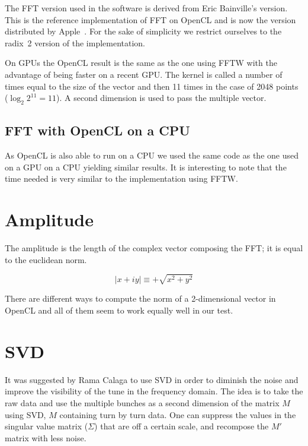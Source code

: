 The \gls{FFT} version used in the software is derived from Eric Bainville's version. This is the reference implementation of \gls{FFT} on \gls{OpenCL} and is now the version distributed by Apple~\cite{bainville11}. For the sake of simplicity we restrict ourselves to the radix~2 version of the implementation.

On \glspl{GPU} the \gls{OpenCL} result is the same as the one using \gls{FFTW} with the advantage of being faster on a recent \gls{GPU}. The kernel is called a number of times equal to the size of the vector and then 11 times in the case of 2048 points ($\log_{2}{2^{11}} = 11$). A second dimension is used to pass the multiple vector.

\subsection{FFT with OpenCL on a CPU}

As \gls{OpenCL} is also able to run on a \gls{CPU} we used the same code as the one used on a \gls{GPU} on a \gls{CPU} yielding similar results. It is interesting to note that the time needed is very similar to the implementation using \gls{FFTW}.

\section{Amplitude}
\label{sec:amplitude}

The amplitude is the length of the complex vector composing the \gls{FFT}; it is equal to the euclidean norm. 

$$\mid x + i y \mid \equiv +\sqrt{x^2 + y^2}$$ 

There are different ways to compute the norm of a 2-dimensional vector in \gls{OpenCL} and all of them seem to work equally well in our test.

\section{SVD}
\label{sec:SVD}

It was suggested by Rama Calaga to use \gls{SVD} in order to diminish the noise and improve the visibility of the tune in the frequency domain. The idea is to take the raw data and use the multiple bunches as a second dimension of the matrix $M$ using SVD, $M$ containing turn by turn data. One can suppress the values in the singular value matrix ($\Sigma$) that are off a certain scale, and recompose the $M'$ matrix with less noise.

